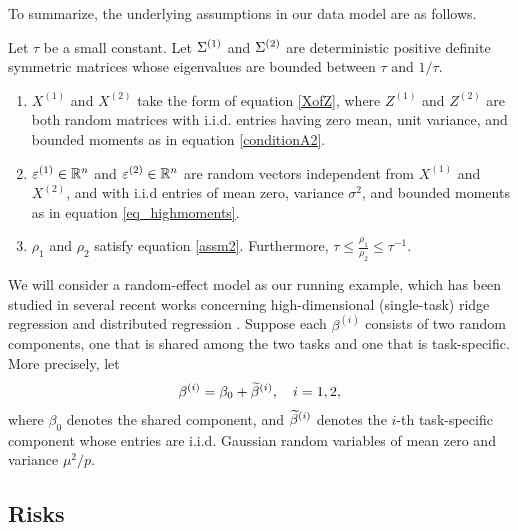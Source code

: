 To summarize, the underlying assumptions in our data model are as follows.
\begin{assumption}\label{assm_big1}
Let $\tau$ be a small constant.
Let $\Sigma^{(1)}$ and $\Sigma^{(2)}$ are deterministic positive definite symmetric matrices whose eigenvalues are bounded between $\tau$ and $1 / \tau$.
\begin{enumerate}
\item  $X^{(1)}$ and $X^{(2)}$ take the form of equation \eqref{XofZ}, where $Z^{(1)}$ and $Z^{(2)}$ are both random matrices with i.i.d. entries having zero mean, unit variance, and bounded moments as in equation \eqref{conditionA2}.

\item $\varepsilon^{(1)} \in \mathbb{R}^{n}$ and $\varepsilon^{(2)} \in \mathbb{R}^{n}$ are random vectors independent from $X^{(1)}$ and $X^{(2)}$, and with i.i.d entries of mean zero, variance $\sigma^2$, and bounded moments as in equation \eqref{eq_highmoments}.

\item $\rho_{1}$ and $\rho_{2}$ satisfy equation \eqref{assm2}. Furthermore, $\tau \le \frac{\rho_1}{\rho_2}\le \tau^{-1}$.
\end{enumerate}
\end{assumption}

We will consider a random-effect model as our running example, which has been studied in several recent works concerning high-dimensional (single-task) ridge regression \cite{dobriban2018high} and distributed regression \cite{dobriban2020wonder}.
Suppose each $\beta^{(i)}$ consists of two random components, one that is shared among the two tasks and one that is task-specific. More precisely, let
\begin{align}
    \beta^{(i)}=\beta_0 +\widetilde \beta^{(i)},\quad i=1,2, \label{eq_re}
\end{align}
where $\beta_0$ denotes the shared component, %
and $\widetilde \beta^{(i)}$ denotes the $i$-th
task-specific component whose entries are i.i.d. Gaussian random variables of mean zero and variance $\mu^2 / p$.


\subsection{Risks}\label{sec_risk}

